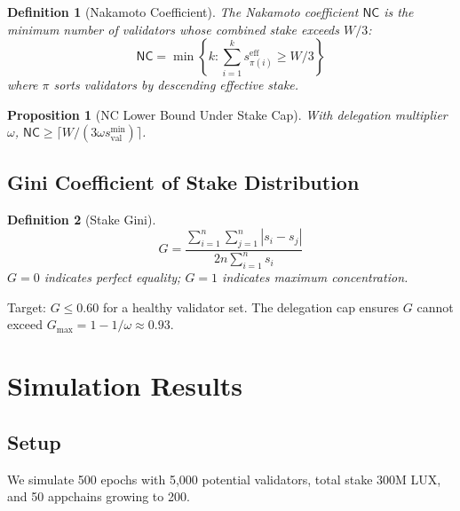 \documentclass[11pt,a4paper]{article}
\newtheorem{proposition}[theorem]{Proposition}
\newtheorem{definition}{Definition}
\begin{document}
\begin{definition}[Nakamoto Coefficient]
The Nakamoto coefficient $\mathsf{NC}$ is the minimum number of validators whose combined stake exceeds $W/3$:
\begin{equation}
    \mathsf{NC} = \min \left\{ k : \sum_{i=1}^{k} s_{\pi(i)}^{\text{eff}} \geq W/3 \right\}
\end{equation}
where $\pi$ sorts validators by descending effective stake.
\end{definition}

\begin{proposition}[NC Lower Bound Under Stake Cap]
With delegation multiplier $\omega$, $\mathsf{NC} \geq \lceil W / (3 \omega s^{\min}_{\text{val}}) \rceil$.
\end{proposition}

\subsection{Gini Coefficient of Stake Distribution}

\begin{definition}[Stake Gini]
\begin{equation}
    G = \frac{\sum_{i=1}^{n} \sum_{j=1}^{n} |s_i - s_j|}{2n \sum_{i=1}^{n} s_i}
\end{equation}
$G = 0$ indicates perfect equality; $G = 1$ indicates maximum concentration.
\end{definition}

Target: $G \leq 0.60$ for a healthy validator set. The delegation cap ensures $G$ cannot exceed $G_{\max} = 1 - 1/\omega \approx 0.93$.

\section{Simulation Results}\label{sec:simulation}

\subsection{Setup}

We simulate 500 epochs with 5,000 potential validators, total stake 300M LUX, and 50 appchains growing to 200.
\end{document}
